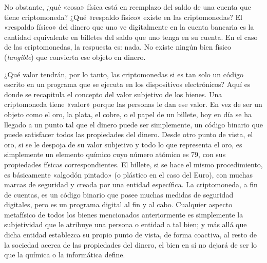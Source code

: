 \documentclass[12pt,a4paper,twoside]{book}
\begin{document}
No obstante, ¿qué «cosa» física está en reemplazo del saldo de una cuenta que tiene criptomoneda? ¿Qué «respaldo físico» existe en las criptomonedas? El «respaldo físico» del dinero que uno ve digitalmente en la cuenta bancaria es la cantidad equivalente en billetes del saldo que uno tenga en su cuenta. En el caso de las criptomonedas, la respuesta es: nada. No existe ningún bien físico (\textit{tangible}) que convierta ese objeto en dinero.

¿Qué valor tendrán, por lo tanto, las criptomonedas si es tan solo un código escrito en un programa que se ejecuta en los dispositivos electrónicos? Aquí es donde se recapitula el concepto del valor subjetivo de los bienes. Una criptomoneda tiene «valor» porque las personas le dan ese valor. En vez de ser un objeto como el oro, la plata, el cobre, o el papel de un billete, hoy en día se ha llegado a un punto tal que el dinero puede ser simplemente, un código binario que puede satisfacer todos las propiedades del dinero. Desde otro punto de vista, el oro, si se le despoja de su valor subjetivo y todo lo que representa el oro, es simplemente un elemento químico cuyo número atómico es 79, con sus propiedades físicas correspondientes. El billete, si se hace el mismo procedimiento, es básicamente «algodón pintado» (o plástico en el caso del Euro), con muchas marcas de seguridad y creada por una entidad específica. La criptomoneda, a fin de cuentas, es un código binario que posee muchas medidas de seguridad digitales, pero es un programa digital al fin y al cabo. Cualquier aspecto metafísico de todos los bienes mencionados anteriormente es simplemente la subjetividad que le atribuye una persona o entidad a tal bien; y más allá que dicha entidad establezca su propio punto de vista, de forma coactiva, al resto de la sociedad acerca de las propiedades del dinero, el bien en sí no dejará de ser lo que la química o la informática define.
\end{document}
